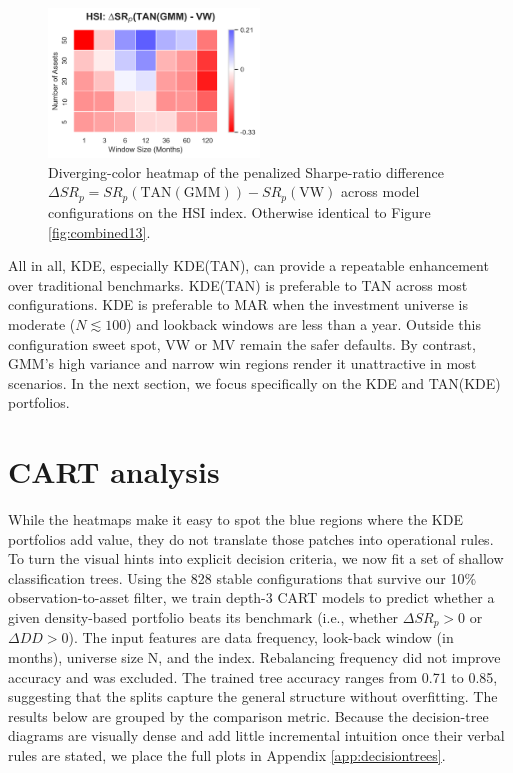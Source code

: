 \begin{figure}[H]
  \begin{center}
  \begin{minipage}{1\textwidth}
    \centering
    \includegraphics[width=0.5\textwidth]{images/40_18.png}
  \end{minipage}
  \caption[Heatmap 5]{Diverging-color heatmap of the penalized Sharpe-ratio difference $\Delta SR_p = SR_p(\mathrm{TAN(GMM)}) - SR_p(\mathrm{VW})$ across model configurations on the HSI index. Otherwise identical to Figure \ref{fig:combined13}.}
  \label{fig:combined17}
  \end{center}
  \end{figure}

All in all, KDE, especially KDE(TAN), can provide a repeatable enhancement over traditional benchmarks. KDE(TAN) is preferable to TAN across most configurations. KDE is preferable to MAR when the investment universe is moderate ($N \lesssim 100$) and lookback windows are less than a year. Outside this configuration sweet spot, VW or MV remain the safer defaults. By contrast, GMM's high variance and narrow win regions render it unattractive in most scenarios. In the next section, we focus specifically on the KDE and TAN(KDE) portfolios.

\section{CART analysis}
While the heatmaps make it easy to spot the blue regions where the KDE portfolios add value, they do not translate those patches into operational rules. To turn the visual hints into explicit decision criteria, we now fit a set of shallow classification trees. Using the 828 stable configurations that survive our 10\% observation-to-asset filter, we train depth-3 CART models to predict whether a given density-based portfolio beats its benchmark (i.e., whether $\Delta SR_{p}>0$ or $\Delta DD>0$). The input features are data frequency, look-back window (in months), universe size N, and the index. Rebalancing frequency did not improve accuracy and was excluded. The trained tree accuracy ranges from 0.71 to 0.85, suggesting that the splits capture the general structure without overfitting. The results below are grouped by the comparison metric. Because the decision-tree diagrams are visually dense and add little incremental intuition once their verbal rules are stated, we place the full plots in Appendix \ref{app:decisiontrees}.

